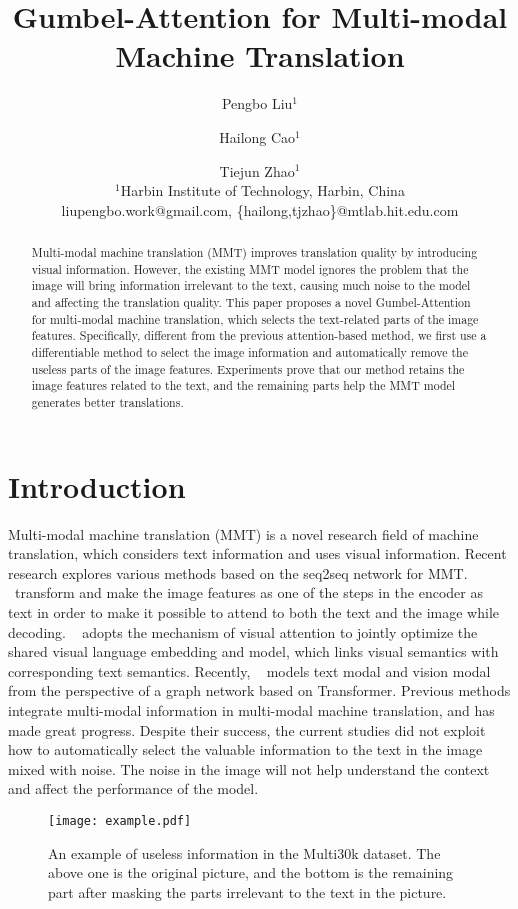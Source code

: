 \documentclass[11pt]{article}
\title{Gumbel-Attention for Multi-modal Machine Translation}
\author{
Pengbo Liu$^1$
\and
Hailong Cao$^1$\and
Tiejun Zhao$^1$ \\



$^1$Harbin Institute of Technology, Harbin, China\\


liupengbo.work@gmail.com, \{hailong,tjzhao\}@mtlab.hit.edu.com
}
\begin{document}
\maketitle
\begin{abstract}
Multi-modal machine translation (MMT) improves translation quality by introducing visual information. However, the existing MMT model ignores the problem that the image will bring information irrelevant to the text, causing much noise to the model and affecting the translation quality. This paper proposes a novel Gumbel-Attention for multi-modal machine translation, which selects the text-related parts of the image features. Specifically, different from the previous attention-based method, we first use a differentiable method to select the image information and automatically remove the useless parts of the image features. 
Experiments prove that our method retains the image features related to the text, and the remaining parts help the MMT model generates better translations.
\end{abstract}

\section{Introduction}

Multi-modal machine translation (MMT) is a novel research field of machine translation, which considers text information and uses visual information.
Recent research explores various methods based on the seq2seq network for MMT. 
~\citet{DBLP:conf/wmt/HuangLSOD16}transform and make the image features as one of the steps in the encoder as text in order to make it possible to attend to both the text and the image while decoding.
~\citet{DBLP:conf/emnlp/ZhouCLY18} adopts the mechanism of visual attention to jointly optimize the shared visual language embedding and model, which links visual semantics with corresponding text semantics. 
Recently, ~\citet{DBLP:conf/acl/YaoW20} models text modal and vision modal from the perspective of a graph network based on Transformer.
Previous methods integrate multi-modal information in multi-modal machine translation, and has made great progress. 
Despite their success, the current studies did not exploit how to automatically select the valuable information to the text in the image mixed with noise.
The noise in the image will not help understand the context and affect the performance of the model.

\begin{figure}[t]
\centering\texttt{[image: example.pdf]}
	\footnotesize\caption{An example of useless information in the Multi30k dataset. The above one is the original picture, and the bottom is the remaining part after masking the parts irrelevant to the text in the picture.} 
	\label{fig:01}
\end{figure}
\end{document}
